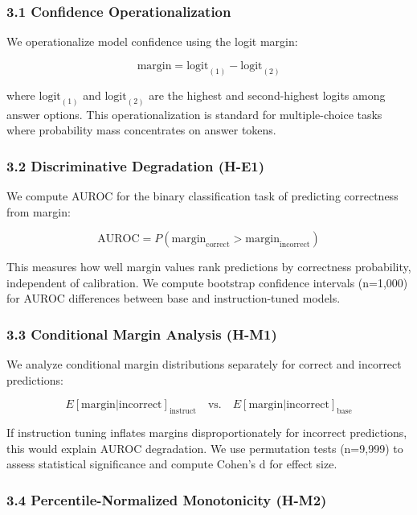 
\subsubsection{3.1 Confidence Operationalization}

We operationalize model confidence using the logit margin:

$$\text{margin} = \text{logit}_{(1)} - \text{logit}_{(2)}$$

where $\text{logit}_{(1)}$ and $\text{logit}_{(2)}$ are the highest and second-highest logits among answer options. This operationalization is standard for multiple-choice tasks where probability mass concentrates on answer tokens.

\subsubsection{3.2 Discriminative Degradation (H-E1)}

We compute AUROC for the binary classification task of predicting correctness from margin:

$$\text{AUROC} = P(\text{margin}_{\text{correct}} > \text{margin}_{\text{incorrect}})$$

This measures how well margin values rank predictions by correctness probability, independent of calibration. We compute bootstrap confidence intervals (n=1,000) for AUROC differences between base and instruction-tuned models.

\subsubsection{3.3 Conditional Margin Analysis (H-M1)}

We analyze conditional margin distributions separately for correct and incorrect predictions:

$$E[\text{margin} | \text{incorrect}]_{\text{instruct}} \quad \text{vs.} \quad E[\text{margin} | \text{incorrect}]_{\text{base}}$$

If instruction tuning inflates margins disproportionately for incorrect predictions, this would explain AUROC degradation. We use permutation tests (n=9,999) to assess statistical significance and compute Cohen's d for effect size.

\subsubsection{3.4 Percentile-Normalized Monotonicity (H-M2)}

